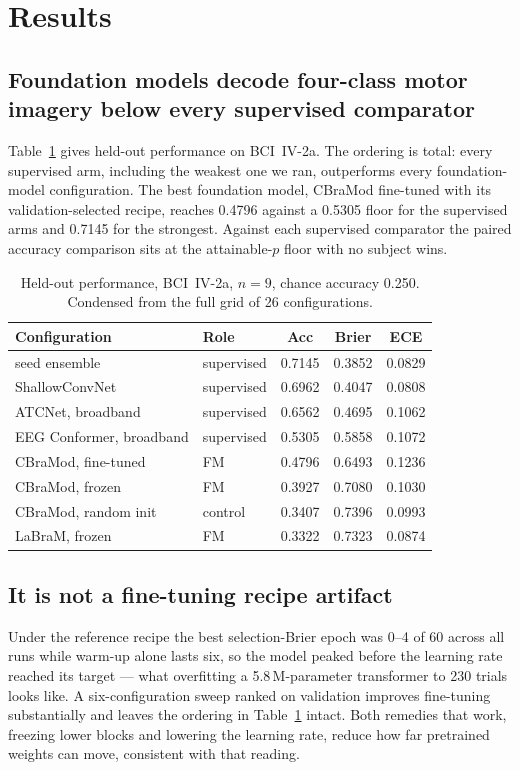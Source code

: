\section{Results}
\label{sec:results}

\subsection{Foundation models decode four-class motor imagery below every
supervised comparator}

Table~\ref{tab:heldout} gives held-out performance on BCI~IV-2a. The ordering
is total: every supervised arm, including the weakest one we ran, outperforms
every foundation-model configuration. The best foundation model, CBraMod
fine-tuned with its validation-selected recipe, reaches 0.4796 against a
0.5305 floor for the supervised arms and 0.7145 for the strongest. Against
each supervised comparator the paired accuracy comparison sits at the
attainable-$p$ floor with no subject wins.

\begin{table}[t]
\centering
\caption{Held-out performance, BCI~IV-2a, $n=9$, chance accuracy 0.250.
Condensed from the full grid of 26 configurations.}
\label{tab:heldout}
\small
\begin{tabular}{llccc}
\toprule
Configuration & Role & Acc & Brier & ECE \\
\midrule
seed ensemble            & supervised & 0.7145 & 0.3852 & 0.0829 \\
ShallowConvNet           & supervised & 0.6962 & 0.4047 & 0.0808 \\
ATCNet, broadband        & supervised & 0.6562 & 0.4695 & 0.1062 \\
EEG Conformer, broadband & supervised & 0.5305 & 0.5858 & 0.1072 \\
\midrule
CBraMod, fine-tuned      & FM         & 0.4796 & 0.6493 & 0.1236 \\
CBraMod, frozen          & FM         & 0.3927 & 0.7080 & 0.1030 \\
CBraMod, random init     & control    & 0.3407 & 0.7396 & 0.0993 \\
LaBraM, frozen           & FM         & 0.3322 & 0.7323 & 0.0874 \\
\bottomrule
\end{tabular}
\end{table}

\subsection{It is not a fine-tuning recipe artifact}
Under the reference recipe the best selection-Brier epoch was 0--4 of 60 across
all runs while warm-up alone lasts six, so the model peaked before the learning
rate reached its target --- what overfitting a 5.8\,M-parameter transformer to
230 trials looks like. A six-configuration sweep ranked on validation improves
fine-tuning substantially and leaves the ordering in Table~\ref{tab:heldout}
intact. Both remedies that work, freezing lower blocks and lowering the learning
rate, reduce how far pretrained weights can move, consistent with that
reading.


